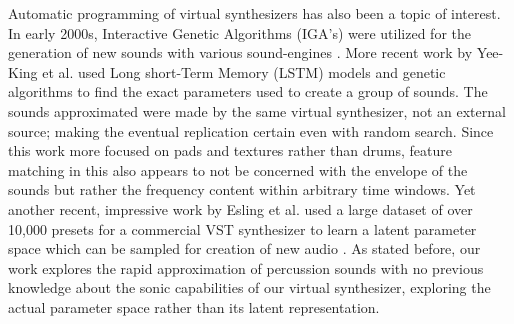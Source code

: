 \documentclass{nime-alternate} %
\begin{document}
Automatic programming of virtual synthesizers has also been a topic of interest. In early 2000s, Interactive Genetic Algorithms (IGA's) were utilized for the generation of new sounds with various sound-engines \cite{johnson1999exploring,dahlstedt2001creating}. More recent work by Yee-King et al. \cite{yee2018automatic} used Long short-Term Memory (LSTM) models and genetic algorithms to find the exact parameters used to create a group of sounds. The sounds approximated were made by the same virtual synthesizer, not an external source; making the eventual replication certain even with random search. Since this work more focused on pads and textures rather than drums, feature matching in this also appears to not be concerned with the envelope of the sounds but rather the frequency content within arbitrary time windows. Yet another recent, impressive work by Esling et al. used a large dataset of over 10,000 presets for a commercial VST synthesizer to learn a latent parameter space which can be sampled for creation of new audio \cite{esling2019universal}. As stated before, our work explores the rapid approximation of percussion sounds with no previous knowledge about the sonic capabilities of our virtual synthesizer, exploring the actual parameter space rather than its latent representation. 
\end{document}
